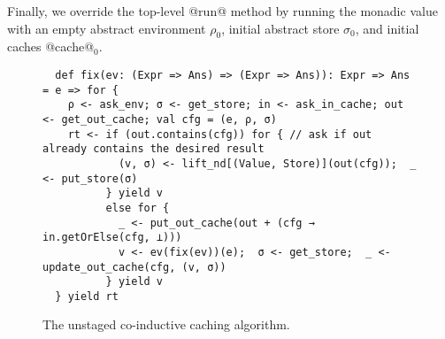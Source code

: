 Finally, we override the top-level @run@ method by running the monadic value
with an empty abstract environment $\rho_0$, initial abstract store $\sigma_0$,
and initial caches @cache@$_0$.
\begin{figure}[t]
  \centering
\begin{lstlisting}
  def fix(ev: (Expr => Ans) => (Expr => Ans)): Expr => Ans = e => for {
    ρ <- ask_env; σ <- get_store; in <- ask_in_cache; out <- get_out_cache; val cfg = (e, ρ, σ)
    rt <- if (out.contains(cfg)) for { // ask if out already contains the desired result
            (v, σ) <- lift_nd[(Value, Store)](out(cfg));  _ <- put_store(σ)
          } yield v
          else for {
            _ <- put_out_cache(out + (cfg → in.getOrElse(cfg, ⊥)))
            v <- ev(fix(ev))(e);  σ <- get_store;  _ <- update_out_cache(cfg, (v, σ))
          } yield v
  } yield rt
\end{lstlisting}
\vspace{-1em}
\caption{The unstaged co-inductive caching algorithm.}
\label{fig:coind_cache}
\vspace{-1em}
\end{figure}

